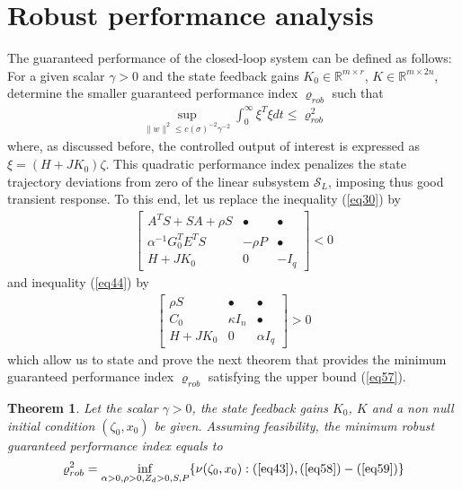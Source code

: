 \documentclass[twocolumn]{autarc_LH}
\newcommand{\Rf}{{\mathbb R}}
\newtheorem{theorem}{Theorem}
\begin{document}
\section{Robust performance analysis}

The guaranteed performance of the closed-loop system can be defined as follows: For a given scalar $\gamma>0$ and the state feedback gains $K_0 \in \Rf^{m \times r}$, $K \in \Rf^{m \times 2n}$, determine the smaller guaranteed performance index $\varrho_{rob}$ such that 
\begin{align} 
\label{eq57}  \sup_{\|w\|^2 \leq c(\sigma)^{-2} \gamma^{-2}} \int_0^\infty \xi^T \xi dt \leq \varrho_{rob}^2
\end{align}
where, as discussed before, the controlled output of interest is expressed as $\xi = (H+ JK_0 ) \zeta$. This quadratic performance index penalizes the state trajectory deviations from zero of the linear subsystem $\mathcal{S}_L$, imposing thus good transient response. To this end, let us replace the inequality (\ref{eq30}) by
\begin{align} 
\label{eq58} \left [ \begin{array}{ccc}  A^TS + S A + \rho S & \bullet & \bullet \\ \alpha^{-1} G_0^TE^TS & - \rho P & \bullet \\ H + JK_0 & 0 & - I_q \end{array} \right ] < 0
\end{align}
and inequality (\ref{eq44}) by 
\begin{align}
		\label{eq59}  \left [ \begin{array}{ccc} \rho S &  \bullet & \bullet \\ C_{0} & \kappa I_n & \bullet \\ H + JK_0 & 0 & \alpha I_q \end{array} \right ] > 0
\end{align}
which allow us to state and prove the next theorem that provides the minimum guaranteed performance index $\varrho_{rob}$ satisfying the upper bound (\ref{eq57}). 
\begin{theorem} \label{theorem04}
Let the scalar $\gamma>0$, the state feedback gains $K_0$, $K$ and a non null initial condition $(\zeta_0, x_0)$ be given. Assuming feasibility, the minimum robust guaranteed performance index equals to 
\begin{align}
		\label{eq60}  \varrho_{rob}^2 = \inf_{\alpha>0, \rho>0, Z_d>0, S, P} \{ \nu(\zeta_0, x_0) : (\ref{eq43}), (\ref{eq58})-(\ref{eq59}) \} 
\end{align}
\end{theorem}
\end{document}

